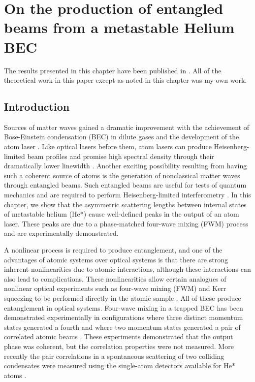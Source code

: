 \chapter{On the production of entangled beams from a metastable Helium BEC}
\label{Peaks}
\graphicspath{{Figures/Peaks/}}

The results presented in this chapter have been published in \citet{Dall:2009}. All of the theoretical work in this paper except as noted in this chapter was my own work.

\section{Introduction}
Sources of matter waves gained a dramatic improvement with the achievement of Bose-Einstein condensation (BEC) in dilute gases and the development of the atom laser \citep{Anderson:1995vn,Mewes:1997}. Like optical lasers before them, atom lasers can produce Heisenberg-limited beam profiles \citep{Busch:2002zr,Riou:2006uq} and promise high spectral density through their dramatically lower linewidth \citep{Wiseman:1997ba}. Another exciting possibility resulting from having such a coherent source of atoms is the generation of nonclassical matter waves through entangled beams. Such entangled beams are useful for tests of quantum mechanics and are required to perform Heisenberg-limited interferometry \citep{Dowling:1998,Reid:1988}. In this chapter, we show that the asymmetric scattering lengths between internal states of metastable helium (He*) cause well-defined peaks in the output of an atom laser. These peaks are due to a phase-matched four-wave mixing (FWM) process and are experimentally demonstrated.

A nonlinear process is required to produce entanglement, and one of the advantages of atomic systems over optical systems is that there are strong inherent nonlinearities due to atomic interactions, although these interactions can also lead to complications. These nonlinearities allow certain analogues of nonlinear optical experiments such as four-wave mixing (FWM) and Kerr squeezing to be performed directly in the atomic sample \citep{WallsMilburn}. All of these produce entanglement in optical systems. Four-wave mixing in a trapped BEC has been demonstrated experimentally in configurations where three distinct momentum states generated a fourth \citep{Deng:1999qy} and where two momentum states generated a pair of correlated atomic beams \citep{Vogels:2002}. These experiments demonstrated that the output phase was coherent, but the correlation properties were not measured. More recently the pair correlations in a spontaneous scattering of two colliding condensates were measured using the single-atom detectors available for He* atoms \citep{Perrin:2007}.

